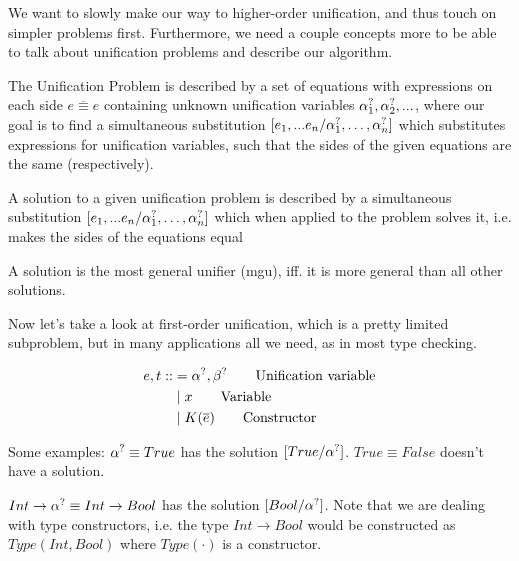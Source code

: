 \documentclass[twoside,12pt,a4paper]{article}
\begin{document}
We want to slowly make our way to higher-order unification, and thus touch on simpler problems first. 
Furthermore, we need a couple concepts more to be able to talk about unification problems and describe our algorithm. 

The Unification Problem is described by a set of equations with expressions on each side $\overline{e\equiv e}$ containing unknown unification variables $\alpha^?_1, \alpha^?_2, ...$, %
where our goal is to find a simultaneous substitution $[e_1,...e_n / \alpha^?_1, \dots, \alpha^?_n]$ which substitutes expressions for unification variables, 
such that the sides of the given equations are the same (respectively). 

\begin{definition}[Solution]
    A solution to a given unification problem is described by a simultaneous substitution $[e_1,...e_n / \alpha^?_1, \dots, \alpha^?_n]$
    which when applied to the problem solves it, i.e. makes the sides of the equations equal %
\end{definition}
    
\begin{definition}
    A solution is the most general unifier (mgu), iff. it is more general than all other solutions.
\end{definition} 

Now let's take a look at first-order unification, which is a pretty limited subproblem, 
but in many applications all we need, as in most type checking.

\begin{definition}
\begin{align*}
    e, t ::&= \alpha^?, \beta^? \tag*{Unification variable}\\
    &\;|\; x\tag*{Variable} \\
    &\;|\; K(\overline{e}) \tag*{Constructor}
\end{align*}
\end{definition}

Some examples:
$\alpha^? \equiv True$ has the solution $[True/\alpha^?]$.
$True \equiv False$ doesn't have a solution.

$Int\rightarrow \alpha^? \equiv Int \rightarrow Bool$ has the solution $[Bool/\alpha^?]$. 
Note that we are dealing with type constructors, i.e. the type $Int\rightarrow Bool$ would be constructed as $Type(Int, Bool)$ where $Type(\cdot)$ is a constructor.
\end{document}
